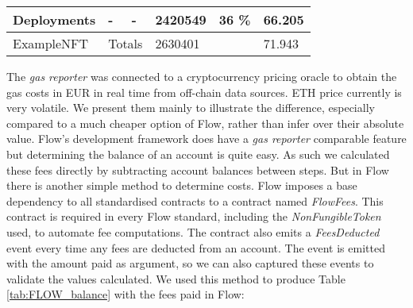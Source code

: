 \documentclass[../NFTComp_IEEE.tex]{subfiles}
\begin{document}
\begin{table}[ht]
{\begin{tabular}{|ll|ll|l|ll|}
            \multicolumn{2}{|l|}{Deployments}          & \multicolumn{1}{l|}{-}                                                            & -                          & 2420549                                                                           & \multicolumn{1}{l|}{36 \%} & 66.205                                    \\ \hline
            \multicolumn{2}{|l|}{ExampleNFT}           & \multicolumn{2}{l|}{Totals}                                                       & 2630401                    & \multicolumn{1}{l|}{}                                                             & 71.943                                                                 \\ \hline
        \end{tabular}%
    }
\end{table}

The \textit{gas reporter} was connected to a cryptocurrency pricing oracle to obtain the gas costs in EUR in real time from off-chain data sources. ETH price currently is very volatile. We present them mainly to illustrate the difference, especially compared to a much cheaper option of Flow, rather than infer over their absolute value. Flow's development framework does have a \textit{gas reporter} comparable feature but determining the balance of an account is quite easy. As such we calculated these fees directly by subtracting account balances between steps. But in Flow there is another simple method to determine costs. Flow imposes a base dependency to all standardised contracts to a contract named \textit{FlowFees}. This contract is required in every Flow standard, including the \textit{NonFungibleToken} used, to automate fee computations. The contract also emits a \textit{FeesDeducted} event every time any fees are deducted from an account. The event is emitted with the amount paid as argument, so we can also captured these events to validate the values calculated. We used this method to produce Table \ref{tab:FLOW_balance} with the fees paid in Flow:
\end{document}
